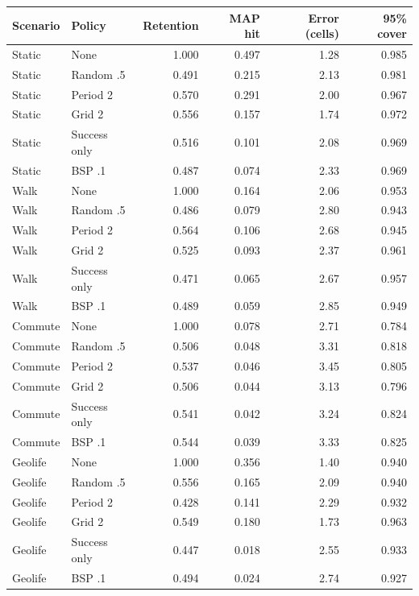 \begin{tabular}{llrrrr}
\toprule
Scenario & Policy & Retention & MAP hit & Error (cells) & 95\% cover \\
\midrule
Static & None & 1.000 & 0.497 & 1.28 & 0.985 \\
Static & Random .5 & 0.491 & 0.215 & 2.13 & 0.981 \\
Static & Period 2 & 0.570 & 0.291 & 2.00 & 0.967 \\
Static & Grid 2 & 0.556 & 0.157 & 1.74 & 0.972 \\
Static & Success only & 0.516 & 0.101 & 2.08 & 0.969 \\
Static & BSP .1 & 0.487 & 0.074 & 2.33 & 0.969 \\
\addlinespace
Walk & None & 1.000 & 0.164 & 2.06 & 0.953 \\
Walk & Random .5 & 0.486 & 0.079 & 2.80 & 0.943 \\
Walk & Period 2 & 0.564 & 0.106 & 2.68 & 0.945 \\
Walk & Grid 2 & 0.525 & 0.093 & 2.37 & 0.961 \\
Walk & Success only & 0.471 & 0.065 & 2.67 & 0.957 \\
Walk & BSP .1 & 0.489 & 0.059 & 2.85 & 0.949 \\
\addlinespace
Commute & None & 1.000 & 0.078 & 2.71 & 0.784 \\
Commute & Random .5 & 0.506 & 0.048 & 3.31 & 0.818 \\
Commute & Period 2 & 0.537 & 0.046 & 3.45 & 0.805 \\
Commute & Grid 2 & 0.506 & 0.044 & 3.13 & 0.796 \\
Commute & Success only & 0.541 & 0.042 & 3.24 & 0.824 \\
Commute & BSP .1 & 0.544 & 0.039 & 3.33 & 0.825 \\
\addlinespace
Geolife & None & 1.000 & 0.356 & 1.40 & 0.940 \\
Geolife & Random .5 & 0.556 & 0.165 & 2.09 & 0.940 \\
Geolife & Period 2 & 0.428 & 0.141 & 2.29 & 0.932 \\
Geolife & Grid 2 & 0.549 & 0.180 & 1.73 & 0.963 \\
Geolife & Success only & 0.447 & 0.018 & 2.55 & 0.933 \\
Geolife & BSP .1 & 0.494 & 0.024 & 2.74 & 0.927 \\
\bottomrule
\end{tabular}